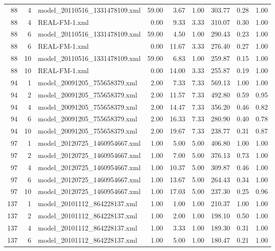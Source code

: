 \begin{table}[ht]
\begin{tabular}{rrlrrrrrr}
   88 &   4 & model\_20110516\_1331478109.xml & 59.00 & 3.67 & 1.00 & 303.77 & 0.28 & 1.00 \\ 
   88 &   4 & REAL-FM-1.xml & 0.00 & 9.33 & 3.33 & 310.07 & 0.30 & 1.00 \\ 
   88 &   6 & model\_20110516\_1331478109.xml & 59.00 & 4.50 & 1.00 & 290.43 & 0.23 & 1.00 \\ 
   88 &   6 & REAL-FM-1.xml & 0.00 & 11.67 & 3.33 & 276.40 & 0.27 & 1.00 \\ 
   88 &  10 & model\_20110516\_1331478109.xml & 59.00 & 6.83 & 1.00 & 259.87 & 0.15 & 1.00 \\ 
   88 &  10 & REAL-FM-1.xml & 0.00 & 14.00 & 3.33 & 255.87 & 0.19 & 1.00 \\ 
   94 &   1 & model\_20091205\_755658379.xml & 2.00 & 7.33 & 7.33 & 569.13 & 1.00 & 1.00 \\ 
   94 &   2 & model\_20091205\_755658379.xml & 2.00 & 11.57 & 7.33 & 492.80 & 0.59 & 0.95 \\ 
   94 &   4 & model\_20091205\_755658379.xml & 2.00 & 14.47 & 7.33 & 356.20 & 0.46 & 0.82 \\ 
   94 &   6 & model\_20091205\_755658379.xml & 2.00 & 16.33 & 7.33 & 280.90 & 0.40 & 0.78 \\ 
   94 &  10 & model\_20091205\_755658379.xml & 2.00 & 19.67 & 7.33 & 238.77 & 0.31 & 0.87 \\ 
   97 &   1 & model\_20120725\_1460954667.xml & 1.00 & 5.00 & 5.00 & 406.80 & 1.00 & 1.00 \\ 
   97 &   2 & model\_20120725\_1460954667.xml & 1.00 & 7.00 & 5.00 & 376.13 & 0.73 & 1.00 \\ 
   97 &   4 & model\_20120725\_1460954667.xml & 1.00 & 10.37 & 5.00 & 309.87 & 0.46 & 1.00 \\ 
   97 &   6 & model\_20120725\_1460954667.xml & 1.00 & 13.67 & 5.00 & 264.43 & 0.34 & 1.00 \\ 
   97 &  10 & model\_20120725\_1460954667.xml & 1.00 & 17.03 & 5.00 & 237.30 & 0.25 & 0.96 \\ 
  137 &   1 & model\_20101112\_864228137.xml & 1.00 & 1.00 & 1.00 & 210.37 & 1.00 & 1.00 \\ 
  137 &   2 & model\_20101112\_864228137.xml & 1.00 & 2.00 & 1.00 & 198.10 & 0.50 & 1.00 \\ 
  137 &   4 & model\_20101112\_864228137.xml & 1.00 & 3.33 & 1.00 & 189.30 & 0.31 & 1.00 \\ 
  137 &   6 & model\_20101112\_864228137.xml & 1.00 & 5.00 & 1.00 & 180.47 & 0.21 & 1.00 \\ 

\end{tabular}
\end{table}
